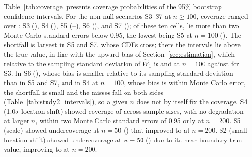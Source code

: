 \documentclass[AMA,Times1COL]{WileyNJDv5}
\begin{document}
Table~\ref{tab:coverage} presents coverage probabilities of the 95\% bootstrap confidence intervals. For the non-null scenarios S3--S7 at $n \geq 100$, coverage ranged over : S3 (), S4 (), S5 (--), S6 (), and S7 (); of these ten cells,  lie more than two Monte Carlo standard errors below 0.95, the lowest being S5 at $n = 100$ (). The shortfall is largest in S5 and S7, whose CDFs cross; there the intervals lie above the true value, in line with the upward bias of Section~\ref{sec:estimation}, which relative to the sampling standard deviation of $\widehat{W}_1$ is  and  at $n = 100$ against  for S3. In S6 (), whose bias is smaller relative to its sampling standard deviation than in S5 and S7, and in S4 at $n = 100$, whose bias is within Monte Carlo error, the shortfall is small and the misses fall on both sides (Table~\ref{tab:study2_intervals}), so a given $n$ does not by itself fix the coverage.
S4 (1.0$\sigma$ location shift) showed coverage of  across sample sizes, with no degradation at larger $n$, within two Monte Carlo standard errors of 0.95 only at $n = 200$. S5 (scale) showed undercoverage at $n=50$ () that improved to  at $n=200$. S2 (small location shift) showed undercoverage at $n=50$ () due to its near-boundary true value, improving to  at $n=200$.
\end{document}

